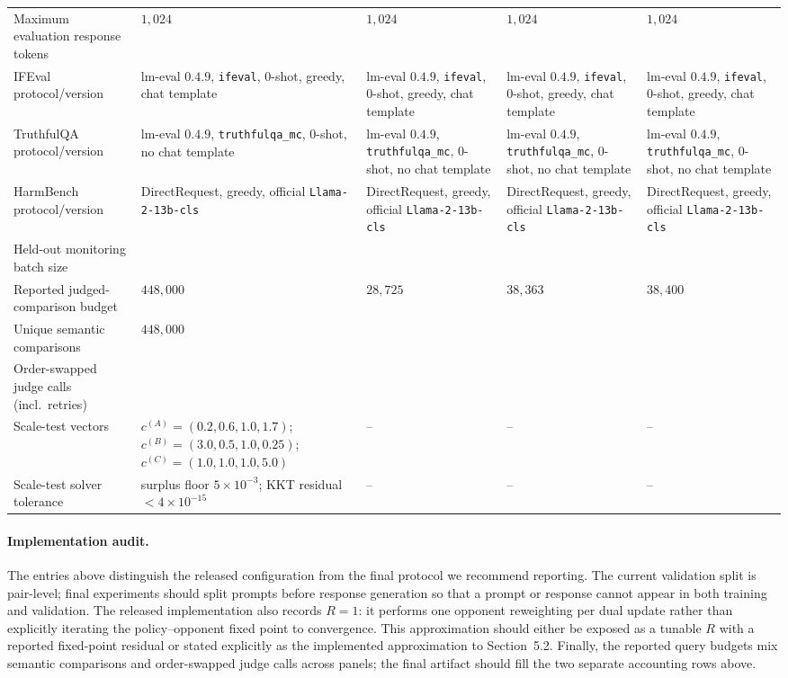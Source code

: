 \documentclass{article}
\theoremstyle{remark}
\theoremstyle{plain}
\begin{document}
\begin{table}[t]
\begin{tabular}{@{}p{}p{}p{}p{}p{}@{}}
Maximum evaluation response tokens & $1{,}024$ & $1{,}024$ & $1{,}024$ & $1{,}024$ \\
IFEval protocol/version & lm-eval $0.4.9$, \texttt{ifeval}, 0-shot, greedy, chat template & lm-eval $0.4.9$, \texttt{ifeval}, 0-shot, greedy, chat template & lm-eval $0.4.9$, \texttt{ifeval}, 0-shot, greedy, chat template & lm-eval $0.4.9$, \texttt{ifeval}, 0-shot, greedy, chat template \\
TruthfulQA protocol/version & lm-eval $0.4.9$, \texttt{truthfulqa\_mc}, 0-shot, no chat template & lm-eval $0.4.9$, \texttt{truthfulqa\_mc}, 0-shot, no chat template & lm-eval $0.4.9$, \texttt{truthfulqa\_mc}, 0-shot, no chat template & lm-eval $0.4.9$, \texttt{truthfulqa\_mc}, 0-shot, no chat template \\
HarmBench protocol/version & DirectRequest, greedy, official \texttt{Llama-2-13b-cls} & DirectRequest, greedy, official \texttt{Llama-2-13b-cls} & DirectRequest, greedy, official \texttt{Llama-2-13b-cls} & DirectRequest, greedy, official \texttt{Llama-2-13b-cls} \\
Held-out monitoring batch size & & & & \\
Reported judged-comparison budget & $448{,}000$ & $28{,}725$ & $38{,}363$ & $38{,}400$ \\
Unique semantic comparisons & $448{,}000$ &  &  &  \\
Order-swapped judge calls (incl.\ retries) &  &  &  &  \\
Scale-test vectors & $c^{(A)}=(0.2,0.6,1.0,1.7)$; $c^{(B)}=(3.0,0.5,1.0,0.25)$; $c^{(C)}=(1.0,1.0,1.0,5.0)$ & -- & -- & -- \\
Scale-test solver tolerance & surplus floor $5\times10^{-3}$; KKT residual $<4\times10^{-15}$ & -- & -- & -- \\
\bottomrule
\end{tabular}
\end{table}

\paragraph{Implementation audit.}
The entries above distinguish the released configuration from the final protocol
we recommend reporting. The current validation split is pair-level; final
experiments should split prompts before response generation so that a prompt or
response cannot appear in both training and validation. The released implementation
also records $R=1$: it performs one opponent reweighting per dual update rather
than explicitly iterating the policy--opponent fixed point to convergence. This
approximation should either be exposed as a tunable $R$ with a reported
fixed-point residual or stated explicitly as the implemented approximation to
Section~5.2. Finally, the reported query budgets mix semantic comparisons and
order-swapped judge calls across panels; the final artifact should fill the two
separate accounting rows above.
\end{document}
